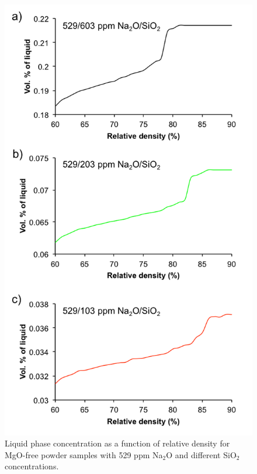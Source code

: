 \newpage
\begin{figure}[H]
	\centering
	\includegraphics{Chapter-4/Figures/Figure3.png}
	\caption{Liquid phase concentration as a function of relative density for MgO-free powder samples with 529 ppm Na$_{2}$O and different SiO$_{2}$ concentrations.}
	\label{Ch4-figure:Figure3}
\end{figure}

